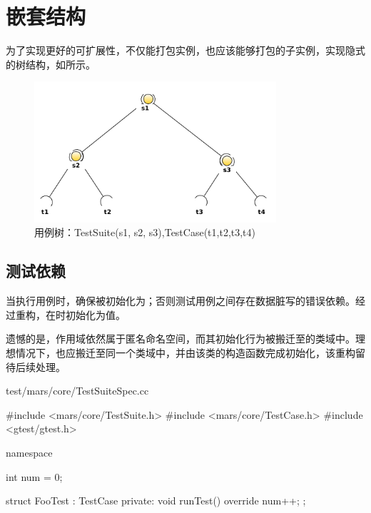 \section{嵌套结构}

\begin{content}

为了实现更好的可扩展性，不仅能打包实例，也应该能够打包的子实例，实现隐式的树结构，如所示。

\begin{figure}[H]
\centering
\includegraphics[width=0.8\textwidth]{figures/xunit/test-tree-example.png}
\caption{用例树：TestSuite(s1, s2, s3),TestCase(t1,t2,t3,t4)}
 \label{fig:test-case-tree}
\end{figure}

\subsection{测试依赖}

当执行用例时，确保被初始化为；否则测试用例之间存在数据脏写的错误依赖。经过重构，在时初始化为值。

遗憾的是，作用域依然属于匿名命名空间，而其初始化行为被搬迁至的类域中。理想情况下，也应搬迁至同一个类域中，并由该类的构造函数完成初始化，该重构留待后续处理。

\begin{diff}{test/mars/core/TestSuiteSpec.cc}
 \begin{minicpp}
#include <mars/core/TestSuite.h>
#include <mars/core/TestCase.h>
#include <gtest/gtest.h>

namespace {
  int num = 0;

  struct FooTest : TestCase {
  private:
    void runTest() override {
      num++;
    }
  };
}


\end{minicpp}
\end{diff}
\end{content}
